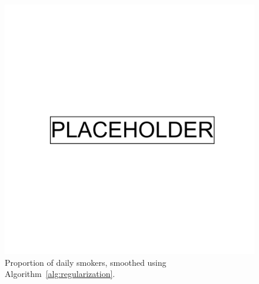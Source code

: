 \begin{figure}[ht]
  \centering
    \includegraphics[width=0.9\linewidth]{placeholder.png}
    \caption[Proportion of daily smokers]{Proportion of daily smokers, smoothed using Algorithm~\ref{alg:regularization}.}
    \label{fig:supp_ukb_smoking}
\end{figure}

\clearpage

